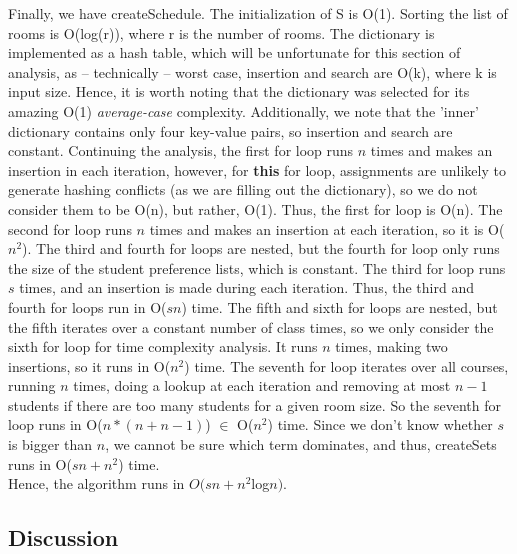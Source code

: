 \documentclass[11pt, oneside]{article}   	%
\begin{document}
 Finally, we have createSchedule. The initialization of S is O(1). Sorting the list of rooms is O(log(r)), where r is the number of rooms. The dictionary is implemented as a hash table, which will be unfortunate for this section of analysis, as – technically – worst case, insertion and search are O(k), where k is input size. Hence, it is worth noting that the dictionary was selected for its amazing O(1) \textit{average-case} complexity. Additionally, we note that the 'inner' dictionary contains only four key-value pairs, so insertion and search are constant. Continuing the analysis, the first for loop runs $n$ times and makes an insertion in each iteration, however, for \textbf{this} for loop, assignments are unlikely to generate hashing conflicts (as we are filling out the dictionary), so we do not consider them to be O(n), but rather, O(1). Thus, the first for loop is O(n). The second for loop runs $n$ times and makes an insertion at each iteration, so it is O($n^2$). The third and fourth for loops are nested, but the fourth for loop only runs the size of the student preference lists, which is constant. The third for loop runs $s$ times, and an insertion is made during each iteration. Thus, the third and fourth for loops run in O($sn$) time. The fifth and sixth for loops are nested, but the fifth iterates over a constant number of class times, so we only consider the sixth for loop for time complexity analysis. It runs $n$ times, making two insertions, so it runs in O($n^2$) time. The seventh for loop iterates over all courses, running $n$ times, doing a lookup at each iteration and removing at most $n-1$ students if there are too many students for a given room size. So the seventh for loop runs in O($n*(n+n-1)$) $\in$ O($n^2$) time. Since we don't know whether $s$ is bigger than $n$, we cannot be sure which term dominates, and thus, createSets runs in O($sn+n^2$) time. \\
 
 Hence, the algorithm runs in $O(sn + n^2$log$n)$. \\

\subsection{Discussion}
\end{document}
